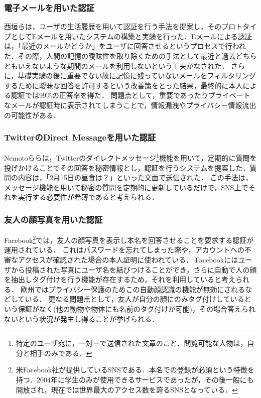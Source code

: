 \subsubsection{電子メールを用いた認証}\label{subsec:emailAuth}
西垣ら\cite{西垣正勝:2006-03-15}は，ユーザの生活履歴を用いて認証を行う手法を提案し，そのプロトタイプとしてEメールを用いたシステムの構築と実験を行った．Eメールによる認証は，「最近のメールかどうか」をユーザに回答させるというプロセスで行われた．その際，人間の記憶の曖昧性を取り除くための手法として最近と過去どちらともいえないような期間のメールを利用しないという工夫がなされた．
さらに，基礎実験の後に重要でない故に記憶に残っていないメールをフィルタリングするために曖昧な回答を許可するという改善策をとった結果，最終的に本人による認証では99\%の正答率を得た．
問題点として，重要であったりプライベートなメールが認証時に表示されてしまうことで，情報漏洩やプライバシー情報流出の可能性がある．

\subsubsection{TwitterのDirect Messageを用いた認証}\label{subsec:twitterDMAuth}
Nemotoら\cite{nemoto:2006-03-15}らは，Twitterのダイレクトメッセージ\footnote{特定のユーザ宛に，一対一で送信された文章のこと．閲覧可能な人物は，自分と相手のみである．}機能を用いて，定期的に質問を投げかけることでその回答を秘密情報とし，認証を行うシステムを提案した．質問の内容は，「2月15日の昼食は？」といった文面で送信された．
この手法は，メッセージ機能を用いて秘密の質問を定期的に更新しているだけで，SNS上でそれを実行する必要性が希薄であると考えられる．

\subsubsection{友人の顔写真を用いた認証}\label{subsec:facebookFaceAuth}
Facebook\footnote{米Facebook社が提供しているSNSである．本名での登録が必須という特徴を持つ．2004年に学生のみが使用できるサービスであったが，その後一般にも開放され，現在では世界最大のアクセス数を誇るSNSとなっている．}では，友人の顔写真を表示し本名を回答させることを要求する認証が運用されている．
これはパスワードを忘れてしまった際や，アカウントへの不審なアクセスが確認された場合の本人証明に使われている．
Facebookにはユーザから投稿された写真にユーザ名を結びつけることができ，さらに自動で人の顔を抽出しタグ付けを行う機能が存在するため，それを利用していると考えられる．
欧州ではプライバシー保護のためこの自動顔認識の機能が無効にされるなどしている．
更なる問題点として，友人が自分の顔にのみタグ付けしているという保証がなく(他の動物や物体にも名前のタグ付けが可能)，その場合答えられないという状況が発生し得ることが挙げられる．

